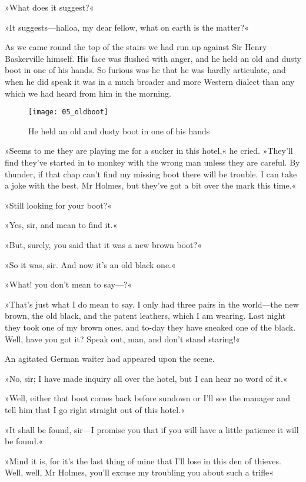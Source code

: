 »What does it suggest?«

»It suggests—halloa, my dear fellow, what on earth is the matter?«

As we came round the top of the stairs we had run up against Sir Henry Baskerville himself. His face was flushed with anger, and he held an old and dusty boot in one of his hands. So furious was he that he was hardly articulate, and when he did speak it was in a much broader and more Western dialect than any which we had heard from him in the morning.

\makeatletter
{}
{%
	\begin{figure}[p]
	\centering
	\texttt{[image: 05\_oldboot]}
	\caption{He held an old and dusty boot in one of his hands}
	\end{figure}
}{%
}
\makeatother



»Seems to me they are playing me for a sucker in this hotel,« he cried. »They'll find they've started in to monkey with the wrong man unless they are careful. By thunder, if that chap can't find my missing boot there will be trouble. I can take a joke with the best, Mr Holmes, but they've got a bit over the mark this time.«

»Still looking for your boot?«

»Yes, sir, and mean to find it.«

»But, surely, you said that it was a new brown boot?«

»So it was, sir. And now it's an old black one.«

»What! you don't mean to say—?«

»That's just what I do mean to say. I only had three pairs in the world—the new brown, the old black, and the patent leathers, which I am wearing. Last night they took one of my brown ones, and to-day they have sneaked one of the black. Well, have you got it? Speak out, man, and don't stand staring!«

An agitated German waiter had appeared upon the scene.

»No, sir; I have made inquiry all over the hotel, but I can hear no word of it.«

»Well, either that boot comes back before sundown or I'll see the manager and tell him that I go right straight out of this hotel.«

»It shall be found, sir—I promise you that if you will have a little patience it will be found.«

»Mind it is, for it's the last thing of mine that I'll lose in this den of thieves. Well, well, Mr Holmes, you'll excuse my troubling you about such a trifle\longdash«

